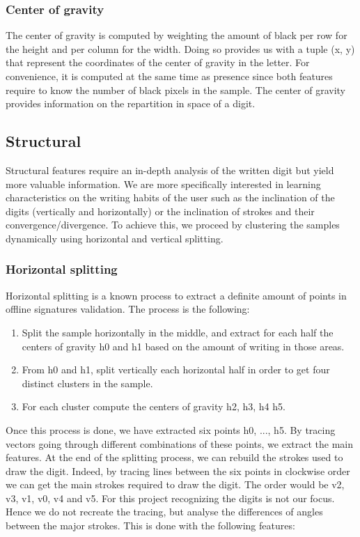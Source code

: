 \documentclass[a4paper]{article}
\begin{document}
{\subsubsection{Center of gravity}
The center of gravity is computed by weighting the amount of black per row for the height and per column for the width. Doing so provides us with a tuple (x, y) that represent the coordinates of the center of gravity in the letter. For convenience, it is computed at the same time as presence since both features require to know the number of black pixels in the sample. The center of gravity provides information on the repartition in space of a digit.

\subsection{Structural}

Structural features require an in-depth analysis of the written digit but yield more valuable information. We are more specifically interested in learning characteristics on the writing habits of the user such as the inclination of the digits (vertically and horizontally) or the inclination of strokes and their convergence/divergence. To achieve this, we proceed by clustering the samples dynamically using horizontal and vertical splitting.

\subsubsection{Horizontal splitting}

Horizontal splitting is a known process to extract a definite amount of points in offline signatures validation. The process is the following: 

\vspace{2mm}
\begin{enumerate}
	\item Split the sample horizontally in the middle, and extract for each half the centers of gravity h0 and h1 based on the amount of writing in those areas.
	\item From h0 and h1, split vertically each horizontal half in order to get four distinct clusters in the sample.
	\item For each cluster compute the centers of gravity h2, h3, h4 h5.
\end{enumerate}
\vspace{2mm}

Once this process is done, we have extracted six points h0, ..., h5. By tracing vectors going through different combinations of these points, we extract the main features. At the end of the splitting process, we can rebuild the strokes used to draw the digit. Indeed, by tracing lines between the six points in clockwise order we can get the main strokes required to draw the digit. The order would be v2, v3, v1, v0, v4 and v5. For this project recognizing the digits is not our focus. Hence we do not recreate the tracing, but analyse the differences of angles between the major strokes. This is done with the following features:

}
\end{document}

